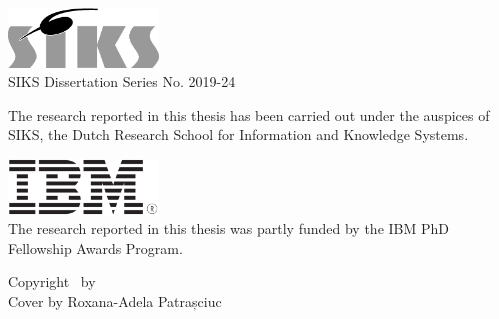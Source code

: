 \thispagestyle{empty}

\begin{addmargin}[-3cm]{1cm}
\vfill

\includegraphics[width=4cm]{front_back_matter/imgs/siks_zw.eps}\\
SIKS Dissertation Series No. 2019-24\bigskip
  

\noindent The research reported in this thesis has been carried out under the auspices of SIKS, the Dutch Research School for Information and Knowledge Systems.\bigskip\bigskip

\noindent \includegraphics[width=4cm]{front_back_matter/imgs/ibm.png}\\
The research reported in this thesis was partly funded by the IBM PhD Fellowship Awards Program.\bigskip\bigskip


\vfill
\noindent Copyright \textcopyright\ \myTime by \myName \\
Cover by Roxana-Adela Patrașciuc
\end{addmargin}